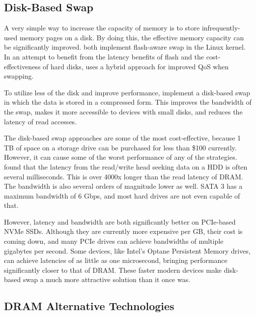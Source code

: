 \documentclass[doublespace,nopageskip]{VTthesis}
\begin{document}
\subsection{Disk-Based Swap}\label{ss:disk-based_swap}
A very simple way to increase the capacity of memory is to store infrequently-used memory pages on a disk. By doing this, the effective memory capacity can be significantly improved.\cite{fass,flashawareswap} both implement flash-aware swap in the Linux kernel. In an attempt to benefit from the latency benefits of flash and the cost-effectiveness of hard disks, \cite{hybridswap} uses a hybrid approach for improved QoS when swapping.

To utilize less of the disk and improve performance, \cite{diskswapcompression, resurrectswapcompression} implement a disk-based swap in which the data is stored in a compressed form. This improves the bandwidth of the swap, makes it more accessible to devices with small disks, and reduces the latency of read accesses.

The disk-based swap approaches are some of the most cost-effective, because 1 TB of space on a storage drive can be purchased for less than \$100 currently. However, it can cause some of the worst performance of any of the strategies. \cite{hddlatency} found that the latency from the read/write head seeking data on a HDD is often several milliseconds. This is over 4000x longer than the read latency of DRAM. The bandwidth is also several orders of magnitude lower as well. SATA 3 has a maximum bandwidth of 6 Gbps, and most hard drives are not even capable of that.

However, latency and bandwidth are both significantly better on PCIe-based NVMe SSDs. Although they are currently more expensive per GB, their cost is coming down, and many PCIe drives can achieve bandwidths of multiple gigabytes per second. Some devices, like Intel's Optane Persistent Memory drives, can achieve latencies of as little as one microsecond, bringing performance significantly closer to that of DRAM. These faster modern devices make disk-based swap a much more attractive solution than it once was.

\subsection{DRAM Alternative Technologies}\label{ss:dram_alternative_technologies}
\end{document}
